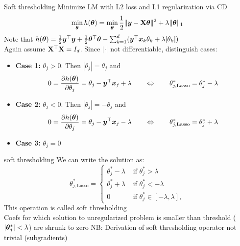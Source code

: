 \documentclass[11pt,compress,t,notes=noshow, xcolor=table]{beamer}
\begin{document}
\begin{framev}{Soft thresholding}
Minimize LM with L2 loss and L1 regularization via CD
$$\min_{\bm{\theta}} h(\bm{\theta}) = \min_{\bm{\theta}} \frac{1}{2}\|\bm{y} - \mathbf{X} \bm{\theta}\|^2 + \lambda \|\bm{\theta}\|_1$$
Note that $h(\bm{\theta}) = \frac{1}{2}\bm{y}^\top \bm{y} + \frac{1}{2}\bm{\theta}^\top \bm{\theta}  - \sum_{k = 1}^d (\bm{y}^\top \bm{x}_k \theta_k + \lambda|\theta_k|)$\\
Again assume $\mathbf{X}^\top \mathbf{X} = I_d$. Since $|\cdot|$ not differentiable, distinguish cases:
\spacer
{\footnotesize
\begin{itemize}
\item \textbf{Case 1:} $\theta_j > 0$.
Then $|\theta_j| = \theta_j$ and
$$0 = \frac{\partial{h}(\bm{\theta})}{\partial \theta_j} = \theta_j - \bm{y}^\top \bm{x}_j + \lambda \qquad \Leftrightarrow \qquad \theta^\ast_{j, \text{Lasso}} = \theta^\ast_j - \lambda$$
\item \textbf{Case 2:} $\theta_j < 0$.
Then $|\theta_j| = - \theta_j$ and
$$0 = \frac{\partial{h}(\bm{\theta})}{\partial \theta_j} = \theta_j - \bm{y}^\top \bm{x}_j - \lambda \qquad \Leftrightarrow \qquad \theta^\ast_{j, \text{Lasso}} = \theta^\ast_j + \lambda$$
\item \textbf{Case 3:} $\theta_j = 0$
\end{itemize}}
\end{framev}


\begin{framev}{soft thresholding}
We can write the solution as:
$$\theta^\ast_{j, \text{Lasso}} =
\begin{cases}
\theta^\ast_j - \lambda & \text{ if } \theta^\ast_j > \lambda \\
\theta^\ast_j + \lambda & \text{ if } \theta^\ast_j < - \lambda \\
0 &  \text{ if }  \theta^\ast_j \in [- \lambda, \lambda],
\end{cases}$$
This operation is called soft thresholding\\
\spacer
Coefs for which solution to unregularized problem is smaller than threshold ($|\bm{\theta}^\ast_j| < \lambda$) are shrunk to zero
\spacer
NB: Derivation of soft thresholding operator not trivial (subgradients)
\end{framev}
\end{document}
